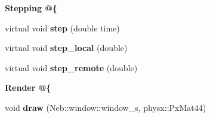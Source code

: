 \begin{Indent}{\bf \-Stepping @\{}\par
\begin{DoxyCompactItemize}
\item 
\hypertarget{classNeb_1_1Actor_1_1Base_aa3a471076f4b9a9df943b420aae8a03f}{virtual void {\bfseries step} (double time)}\label{classNeb_1_1Actor_1_1Base_aa3a471076f4b9a9df943b420aae8a03f}

\item 
\hypertarget{classNeb_1_1Actor_1_1Base_a2a56ccbf85e58c0b86c018cb786cd19e}{virtual void {\bfseries step\-\_\-local} (double)}\label{classNeb_1_1Actor_1_1Base_a2a56ccbf85e58c0b86c018cb786cd19e}

\item 
\hypertarget{classNeb_1_1Actor_1_1Base_a12e2b21526617d9cd24303289f3c833a}{virtual void {\bfseries step\-\_\-remote} (double)}\label{classNeb_1_1Actor_1_1Base_a12e2b21526617d9cd24303289f3c833a}

\end{DoxyCompactItemize}
\end{Indent}
\begin{Indent}{\bf \-Render @\{}\par
\begin{DoxyCompactItemize}
\item 
\hypertarget{classNeb_1_1Actor_1_1Base_a25f3c875b9fc5c1382f82a0bf8824fff}{void {\bfseries draw} (\-Neb\-::window\-::window\-\_\-s, physx\-::\-Px\-Mat44)}\label{classNeb_1_1Actor_1_1Base_a25f3c875b9fc5c1382f82a0bf8824fff}

\end{DoxyCompactItemize}
\end{Indent}

